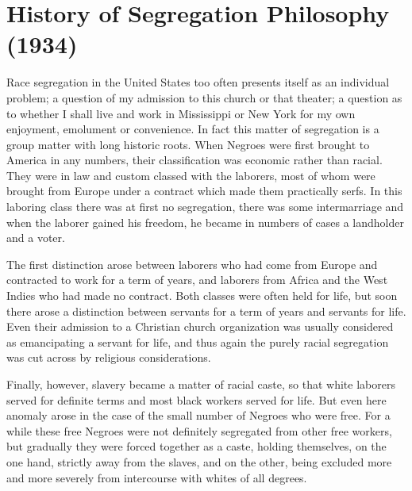 \documentclass[letterpaper,10pt,english]{jupyterBook}
\begin{document}
\section{History of Segregation Philosophy (1934)}
\label{\detokenize{Volumes/41/03/history_of_segregation_philosophy:history-of-segregation-philosophy-1934}}\label{\detokenize{Volumes/41/03/history_of_segregation_philosophy::doc}}
\sphinxAtStartPar
Race segregation in the United States too often presents itself as an individual problem; a question of my admission to this church or that theater; a question as to whether I shall live and work in Mississippi or New York for my own enjoyment, emolument or convenience. In fact this matter of segregation is a group matter with long historic roots. When Negroes were first brought to America in any numbers, their classification was economic rather than racial. They were in law and custom classed with the laborers, most of whom were brought from Europe under a contract which made them practically serfs. In this laboring class there was at first no segregation, there was some inter\sphinxhyphen{}marriage and when the laborer gained his freedom, he became in numbers of cases a landholder and a voter.

\sphinxAtStartPar
The first distinction arose between laborers who had come from Europe and contracted to work for a term of years, and laborers from Africa and the West Indies who had made no contract. Both classes were often held for life, but soon there arose a distinction between servants for a term of years and servants for life. Even their admission to a Christian church organization was usually considered as emancipating a servant for life, and thus again the purely racial segregation was cut across by religious considerations.

\sphinxAtStartPar
Finally, however, slavery became a matter of racial caste, so that white laborers served for definite terms and most black workers served for life. But even here anomaly arose in the case of the small number of Negroes who were free. For a while these free Negroes were not definitely segregated from other free workers, but gradually they were forced together as a caste, holding themselves, on the one hand, strictly away from the slaves, and on the other, being excluded more and more severely from inter\sphinxhyphen{}course with whites of all degrees.
\end{document}
